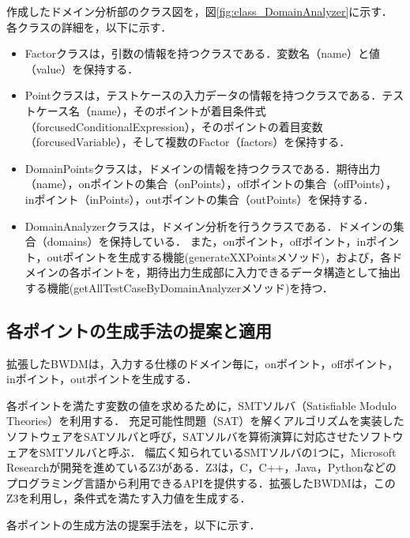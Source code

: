 \documentclass[uplatex, report, a4j, 10pt]{jsbook}
\begin{document}
作成したドメイン分析部のクラス図を，図\ref{fig:class_DomainAnalyzer}に示す．
各クラスの詳細を，以下に示す．

\begin{itemize}
	\item
	Factorクラスは，引数の情報を持つクラスである．変数名（name）と値（value）を保持する．
	\item
	Pointクラスは，テストケースの入力データの情報を持つクラスである．テストケース名（name），そのポイントが着目条件式（forcusedConditionalExpression），そのポイントの着目変数（forcusedVariable），そして複数のFactor（factors）を保持する．
	\item
	DomainPointsクラスは，ドメインの情報を持つクラスである．期待出力（name），onポイントの集合（onPoints），offポイントの集合（offPoints），inポイント（inPoints），outポイントの集合（outPoints）を保持する．
	\item
	DomainAnalyzerクラスは，ドメイン分析を行うクラスである．ドメインの集合（domains）を保持している．
	また，onポイント，offポイント，inポイント，outポイントを生成する機能(generateXXPointsメソッド)，および，各ドメインの各ポイントを，期待出力生成部に入力できるデータ構造として抽出する機能(getAllTestCaseByDomainAnalyzerメソッド)を持つ．

\end{itemize}

\subsection{各ポイントの生成手法の提案と適用}\label{cha:create_point}
拡張したBWDMは，入力する仕様のドメイン毎に，onポイント，offポイント，inポイント，outポイントを生成する．

各ポイントを満たす変数の値を求めるために，SMTソルバ（Satisfiable Modulo Theories）\cite{sat}を利用する．
充足可能性問題（SAT）を解くアルゴリズムを実装したソフトウェアをSATソルバと呼び，SATソルバを算術演算に対応させたソフトウェアをSMTソルバと呼ぶ．
幅広く知られているSMTソルバの1つに，Microsoft Researchが開発を進めているZ3\cite{z3}がある．Z3は，C，C++，Java，Pythonなどのプログラミング言語から利用できるAPIを提供する．拡張したBWDMは，このZ3を利用し，条件式を満たす入力値を生成する．

各ポイントの生成方法の提案手法を，以下に示す．
\end{document}
